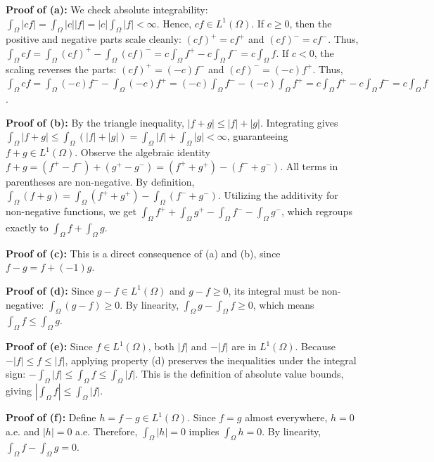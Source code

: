 \begin{pfbox}
    \textbf{Proof of (a):} We check absolute integrability: $\int_\Omega |cf| = \int_\Omega |c||f| = |c| \int_\Omega |f| < \infty$. Hence, $cf \in L^1(\Omega)$.
    If $c \ge 0$, then the positive and negative parts scale cleanly: $(cf)^+ = c f^+$ and $(cf)^- = c f^-$.
    Thus, $\int_\Omega cf = \int_\Omega (cf)^+ - \int_\Omega (cf)^- = c \int_\Omega f^+ - c \int_\Omega f^- = c \int_\Omega f$.
    If $c < 0$, the scaling reverses the parts: $(cf)^+ = (-c) f^-$ and $(cf)^- = (-c) f^+$.
    Thus, $\int_\Omega cf = \int_\Omega (-c) f^- - \int_\Omega (-c) f^+ = (-c) \int_\Omega f^- - (-c) \int_\Omega f^+ = c \int_\Omega f^+ - c \int_\Omega f^- = c \int_\Omega f$.

    \textbf{Proof of (b):} By the triangle inequality, $|f+g| \le |f| + |g|$. Integrating gives $\int_\Omega |f+g| \le \int_\Omega (|f|+|g|) = \int_\Omega |f| + \int_\Omega |g| < \infty$, guaranteeing $f+g \in L^1(\Omega)$.
    Observe the algebraic identity $f+g = (f^+ - f^-) + (g^+ - g^-) = (f^+ + g^+) - (f^- + g^-)$. All terms in parentheses are non-negative.
    By definition, $\int_\Omega (f+g) = \int_\Omega (f^+ + g^+) - \int_\Omega (f^- + g^-)$. Utilizing the additivity for non-negative functions, we get $\int_\Omega f^+ + \int_\Omega g^+ - \int_\Omega f^- - \int_\Omega g^-$, which regroups exactly to $\int_\Omega f + \int_\Omega g$.

    \textbf{Proof of (c):} This is a direct consequence of (a) and (b), since $f-g = f + (-1)g$.

    \textbf{Proof of (d):} Since $g-f \in L^1(\Omega)$ and $g-f \ge 0$, its integral must be non-negative: $\int_\Omega (g-f) \ge 0$. By linearity, $\int_\Omega g - \int_\Omega f \ge 0$, which means $\int_\Omega f \le \int_\Omega g$.

    \textbf{Proof of (e):} Since $f \in L^1(\Omega)$, both $|f|$ and $-|f|$ are in $L^1(\Omega)$. Because $-|f| \le f \le |f|$, applying property (d) preserves the inequalities under the integral sign: $-\int_\Omega |f| \le \int_\Omega f \le \int_\Omega |f|$. This is the definition of absolute value bounds, giving $|\int_\Omega f| \le \int_\Omega |f|$.

    \textbf{Proof of (f):} Define $h = f-g \in L^1(\Omega)$. Since $f=g$ almost everywhere, $h=0$ a.e. and $|h|=0$ a.e. Therefore, $\int_\Omega |h| = 0$ implies $\int_\Omega h = 0$. By linearity, $\int_\Omega f - \int_\Omega g = 0$.

\end{pfbox}



